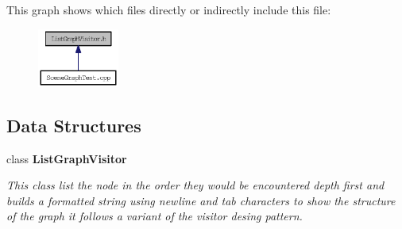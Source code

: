 This graph shows which files directly or indirectly include this file:\nopagebreak
\begin{figure}[H]
\begin{center}
\leavevmode
\includegraphics[width=76pt]{ListGraphVisitor_8h__dep__incl}
\end{center}
\end{figure}
\subsection*{Data Structures}
\begin{CompactItemize}
\item 
class {\bf ListGraphVisitor}
\begin{CompactList}\small\item\em This class list the node in the order they would be encountered depth first and builds a formatted string using newline and tab characters to show the structure of the graph it follows a variant of the visitor desing pattern. \item\end{CompactList}\end{CompactItemize}
